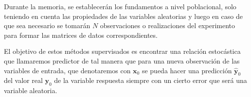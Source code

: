 \noindent Durante la memoria, se establecerán los fundamentos a nivel poblacional, solo teniendo en cuenta las propiedades de las variables aleatorias y luego en caso de que sea necesario se tomarán $N$ observaciones o realizaciones del experimento para formar las matrices de datos correspondientes. 

\noindent El objetivo de estos métodos supervisados es encontrar una relación estocástica que llamaremos predictor de tal manera que para una nueva observación de las variables de entrada, que denotaremos con $\textbf{x}_0$ se pueda hacer una predicción $\hat{\textbf{y}}_0$ del valor real $\textbf{y}_0$ de la variable respuesta siempre con un cierto error que será una variable  aleatoria. 
 
